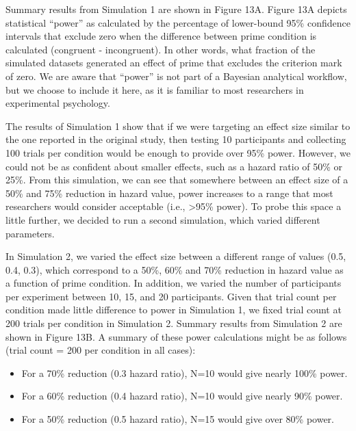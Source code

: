 \documentclass[
  man, donotrepeattitle,floatsintext]{apa6}
\providecommand{\tightlist}{%
  \setlength{\itemsep}{0pt}\setlength{\parskip}{0pt}}
\begin{document}
Summary results from Simulation 1 are shown in Figure 13A.
Figure 13A depicts statistical ``power'' as calculated by the percentage of lower-bound 95\% confidence intervals that exclude zero when the difference between prime condition is calculated (congruent - incongruent).
In other words, what fraction of the simulated datasets generated an effect of prime that excludes the criterion mark of zero.
We are aware that ``power'' is not part of a Bayesian analytical workflow, but we choose to include it here, as it is familiar to most researchers in experimental psychology.

The results of Simulation 1 show that if we were targeting an effect size similar to the one reported in the original study, then testing 10 participants and collecting 100 trials per condition would be enough to provide over 95\% power.
However, we could not be as confident about smaller effects, such as a hazard ratio of 50\% or 25\%.
From this simulation, we can see that somewhere between an effect size of a 50\% and 75\% reduction in hazard value, power increases to a range that most researchers would consider acceptable (i.e., \textgreater95\% power).
To probe this space a little further, we decided to run a second simulation, which varied different parameters.

In Simulation 2, we varied the effect size between a different range of values (0.5, 0.4, 0.3), which correspond to a 50\%, 60\% and 70\% reduction in hazard value as a function of prime condition.
In addition, we varied the number of participants per experiment between 10, 15, and 20 participants.
Given that trial count per condition made little difference to power in Simulation 1, we fixed trial count at 200 trials per condition in Simulation 2.
Summary results from Simulation 2 are shown in Figure 13B.
A summary of these power calculations might be as follows (trial count = 200 per condition in all cases):

\begin{itemize}
\tightlist
\item
  For a 70\% reduction (0.3 hazard ratio), N=10 would give nearly 100\% power.
\item
  For a 60\% reduction (0.4 hazard ratio), N=10 would give nearly 90\% power.
\item
  For a 50\% reduction (0.5 hazard ratio), N=15 would give over 80\% power.
\end{itemize}
\end{document}
